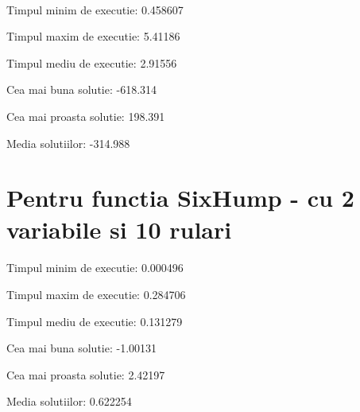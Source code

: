 \documentclass[paper=a4, fontsize=11pt]{scrartcl}
\begin{document}
\paragraph{}
Timpul minim de executie: 0.458607

Timpul maxim de executie: 5.41186

Timpul mediu de executie: 2.91556

Cea mai buna solutie: -618.314

Cea mai proasta solutie: 198.391

Media solutiilor: -314.988

\section{Pentru functia SixHump - cu 2 variabile si 10 rulari}
\paragraph{}
Timpul minim de executie: 0.000496

Timpul maxim de executie: 0.284706

Timpul mediu de executie: 0.131279

Cea mai buna solutie: -1.00131

Cea mai proasta solutie: 2.42197

Media solutiilor: 0.622254
\end{document}
